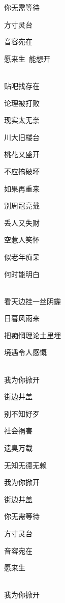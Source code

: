\documentclass[UTF8,12pt,oneside]{ctexbook}
\begin{document}
\begin{center}
            你无需等待
            
            方寸灵台
            
            音容宛在
            
            愿来生\ 能想开

            ~\\
            贴吧找存在
            
            论理被打败
            
            现实太无奈
            
            川大旧楼台
            
            桃花又盛开
            
            不应搞破坏
            
            如果再重来
            
            别周冠亮戴
            
            丢人又失财
            
            空惹人笑怀
            
            似老年痴呆
            
            何时能明白

            ~\\
            看天边挂一丝阴霾
            
            日暮风雨来
            
            把痴惘理论土里埋
            
            境遇令人感慨

            ~\\
            我为你掀开
            
            街边井盖
            
            别不知好歹
            
            社会祸害
            
            遗臭万载
            
            无知无德无赖
            
            我为你掀开
            
            街边井盖
            
            你无需等待
            
            方寸灵台
            
            音容宛在
            
            愿来生

            ~\\
            我为你掀开
            

\end{center}
\end{document}
